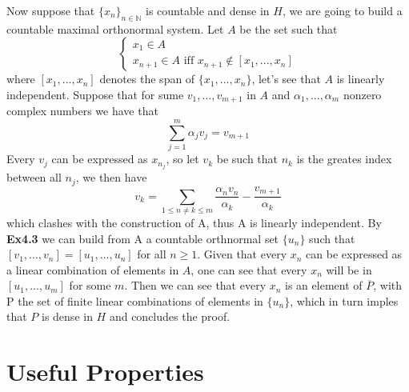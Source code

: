 \documentclass{article}
\begin{document}
\begin{exercise}
Now suppose that $\{x_n\}_{n \in \mathbb{N}}$ is countable and dense in $H$, we are going to build a countable maximal orthonormal system. Let $A$ be the set such that
\[
   \begin{cases}
      x_1 \in A \\
      x_{n+1} \in A \text{ iff } x_{n+1} \notin [ x_1, ..., x_n ]
   \end{cases} 
\]
where $[x_1, ..., x_n]$ denotes the span of $\{x_1, ..., x_n\}$, let's see that $A$ is linearly independent. Suppose that for sume $v_1, ..., v_{m+1}$ in $A$ and $\alpha_1, ..., \alpha_m$ nonzero complex numbers we have that
\[
    \sum_{j=1}^{m} \alpha_j v_j = v_{m+1}
\]
Every $v_j$ can be expressed as $x_{n_j}$, so let $v_k$ be such that $n_k$ is the greates index between all $n_j$, we then have
\[
    v_k = \sum_{1 \le n \neq k \le m} \frac{\alpha_n v_n}{\alpha_k} - \frac{v_{m+1}}{\alpha_k}
\]
which clashes with the construction of A, thus A is linearly independent. By \textbf{Ex4.3} we can build from A a countable orthnormal set $\{u_n\}$ such that $[v_1, ..., v_n] = [u_1, ..., u_n]$ for all $n \ge 1$. Given that every $x_n$ can be expressed as a linear combination of elements in $A$, one can see that every $x_n$ will be in $[u_1, ..., u_m]$ for some $m$. Then we can see that every $x_n$ is an element of $\overline{P}$, with P the set of finite linear combinations of elements in $\{u_n\}$, which in turn imples that $P$ is dense in $H$ and concludes the proof. 
\end{exercise}

\section*{Useful Properties}
\end{document}
